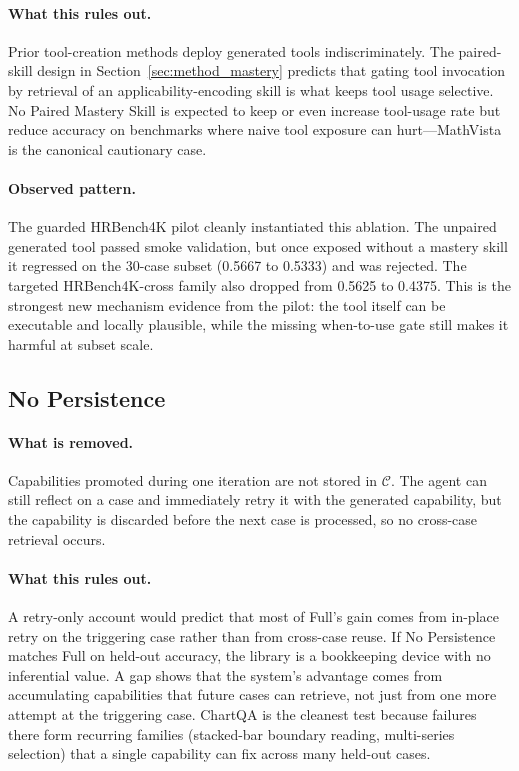 \paragraph{What this rules out.}
Prior tool-creation methods deploy generated tools indiscriminately. The paired-skill
design in Section~\ref{sec:method_mastery} predicts that gating tool invocation by
retrieval of an applicability-encoding skill is what keeps tool usage selective.
No Paired Mastery Skill is expected to keep or even increase tool-usage rate but reduce
accuracy on benchmarks where naive tool exposure can hurt---MathVista is the canonical
cautionary case.

\paragraph{Observed pattern.}
The guarded HRBench4K pilot cleanly instantiated this ablation. The unpaired generated tool
passed smoke validation, but once exposed without a mastery skill it regressed on the
30-case subset (0.5667 to 0.5333) and was rejected. The targeted HRBench4K-cross family also
dropped from 0.5625 to 0.4375. This is the strongest new mechanism evidence from the
pilot: the tool itself can be executable and locally plausible, while the missing
when-to-use gate still makes it harmful at subset scale.

\subsection{No Persistence}
\label{app:abl_persistence}

\paragraph{What is removed.}
Capabilities promoted during one iteration are not stored in $\mathcal{C}$. The agent can
still reflect on a case and immediately retry it with the generated capability, but the
capability is discarded before the next case is processed, so no cross-case retrieval
occurs.

\paragraph{What this rules out.}
A retry-only account would predict that most of Full's gain comes from in-place retry on
the triggering case rather than from cross-case reuse. If No Persistence matches Full on
held-out accuracy, the library is a bookkeeping device with no inferential value. A gap
shows that the system's advantage comes from accumulating capabilities that future cases
can retrieve, not just from one more attempt at the triggering case. ChartQA is the
cleanest test because failures there form recurring families (stacked-bar boundary
reading, multi-series selection) that a single capability can fix across many held-out
cases.

